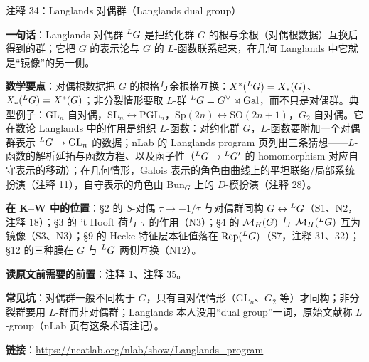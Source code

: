\begin{kcard}{注释 34：Langlands 对偶群（Langlands dual group）}

\textbf{一句话}：Langlands 对偶群 ${}^{L}G$ 是把约化群 $G$ 的根与余根（对偶根数据）互换后得到的群；它把 $G$ 的表示论与 $G$ 的 $L$-函数联系起来，在几何 Langlands 中它就是“镜像”的另一侧。

\textbf{数学要点}：对偶根数据把 $G$ 的根格与余根格互换：$X^*({}^{L}G)=X_*(G)$、$X_*({}^{L}G)=X^*(G)$；非分裂情形要取 $L$-群 ${}^{L}G=G^\vee\rtimes\mathrm{Gal}$，而不只是对偶群。典型例子：$\mathrm{GL}_n$ 自对偶，$\mathrm{SL}_n\leftrightarrow\mathrm{PGL}_n$，$\mathrm{Sp}(2n)\leftrightarrow\mathrm{SO}(2n+1)$，$G_2$ 自对偶。它在数论 Langlands 中的作用是组织 $L$-函数：对约化群 $G$，$L$-函数要附加一个对偶群表示 ${}^{L}G\to\mathrm{GL}_n$ 的数据；nLab 的 Langlands program 页列出三条猜想——$L$-函数的解析延拓与函数方程、以及函子性（${}^{L}G\to{}^{L}G{}'$ 的 homomorphism 对应自守表示的移动）；在几何情形，Galois 表示的角色由曲线上的平坦联络/局部系统扮演（注释 11），自守表示的角色由 $\mathrm{Bun}_G$ 上的 $D$-模扮演（注释 28）。

\textbf{在 K--W 中的位置}：§2 的 $S$-对偶 $\tau\to-1/\tau$ 与对偶群同构 $G\leftrightarrow{}^{L}G$（S1、N2，注释 18）；§3 的 't Hooft 荷与 $\tau$ 的作用（N3）；§4 的 $\mathcal{M}_H(G)$ 与 $\mathcal{M}_H({}^{L}G)$ 互为镜像（S3、N3）；§9 的 Hecke 特征层本征值落在 $\mathrm{Rep}({}^{L}G)$（S7，注释 31、32）；§12 的三种膜在 $G$ 与 ${}^{L}G$ 两侧互换（N12）。

\textbf{读原文前需要的前置}：注释 1、注释 35。

\textbf{常见坑}：对偶群一般不同构于 $G$，只有自对偶情形（$\mathrm{GL}_n$、$G_2$ 等）才同构；非分裂群要用 $L$-群而非对偶群；Langlands 本人没用“dual group”一词，原始文献称 $L$-group（nLab 页有这条术语注记）。

\noindent\textbf{链接}：\url{https://ncatlab.org/nlab/show/Langlands+program}
\end{kcard}

